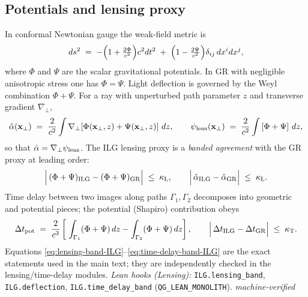 \documentclass[12pt,a4paper]{article}
\begin{document}
\subsection{Potentials and lensing proxy}
In conformal Newtonian gauge the weak-field metric is
\begin{equation}
  ds^2 \;=\; -\Bigl(1+\tfrac{2\Phi}{c^2}\Bigr)c^2dt^2
  \;+\; \Bigl(1-\tfrac{2\Psi}{c^2}\Bigr)\delta_{ij}\,dx^i dx^j,
  \label{eq:metric-potentials}
\end{equation}
where \(\Phi\) and \(\Psi\) are the scalar gravitational potentials. In GR with negligible anisotropic stress one has \(\Phi=\Psi\). Light deflection is governed by the Weyl combination \(\Phi+\Psi\). For a ray with unperturbed path parameter \(z\) and transverse gradient \(\nabla_\perp\),
\begin{equation}
  \hat\alpha(\mathbf{x}_\perp)
  \;=\; \frac{2}{c^2}\int \nabla_\perp\!\left[\Phi(\mathbf{x}_\perp,z)+\Psi(\mathbf{x}_\perp,z)\right]\,dz,
  \qquad
  \psi_{\rm lens}(\mathbf{x}_\perp)
  \;=\; \frac{2}{c^2}\int \left[\Phi+\Psi\right]\,dz,
  \label{eq:deflection-potential}
\end{equation}
so that \(\hat\alpha=\nabla_\perp\psi_{\rm lens}\). The ILG lensing proxy is a \emph{banded agreement} with the GR proxy at leading order:
\begin{equation}
  \Bigl|\,(\Phi+\Psi)_{\rm ILG}-(\Phi+\Psi)_{\rm GR}\Bigr|\;\le\;\kappa_{\rm L},
  \qquad
  \Bigl|\,\hat\alpha_{\rm ILG}-\hat\alpha_{\rm GR}\Bigr|\;\le\;\kappa_{\rm L}.
  \label{eq:lensing-band-ILG}
\end{equation}
Time delay between two images along paths \(\Gamma_1,\Gamma_2\) decomposes into geometric and potential pieces; the potential (Shapiro) contribution obeys
\begin{equation}
  \Delta t_{\rm pot}
  \;=\; \frac{2}{c^3}\left[\;\int_{\Gamma_1} (\Phi+\Psi)\,dz - \int_{\Gamma_2} (\Phi+\Psi)\,dz\right],
  \qquad
  \Bigl|\,\Delta t_{\rm ILG}-\Delta t_{\rm GR}\Bigr|\;\le\;\kappa_{\rm T}.
  \label{eq:time-delay-band-ILG}
\end{equation}
Equations \eqref{eq:lensing-band-ILG}–\eqref{eq:time-delay-band-ILG} are the exact statements used in the main text; they are independently checked in the lensing/time-delay modules.
\emph{Lean hooks (Lensing):} \texttt{ILG.lensing\_band}, \texttt{ILG.deflection}, \texttt{ILG.time\_delay\_band} (\texttt{QG\_LEAN\_MONOLITH}). \emph{machine-verified}
\end{document}

